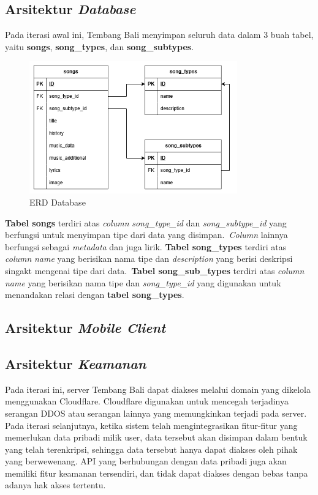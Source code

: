 \documentclass[a4paper, 12pt]{article}
\begin{document}
\subsection{Arsitektur \textit{Database}}
Pada iterasi awal ini, Tembang Bali menyimpan seluruh data dalam 3 buah tabel, yaitu \textbf{songs}, \textbf{song\_types}, dan \textbf{song\_subtypes}.

\begin{figure}[h]
    \centering
    \includegraphics[width=0.8\textwidth]{assets/erd.png}
    \caption{ERD Database}
\end{figure}

\textbf{Tabel songs} terdiri atas \textit{column} \textit{song\_type\_id} dan \textit{song\_subtype\_id} yang berfungsi untuk menyimpan tipe dari data yang disimpan.\
\textit{Column} lainnya berfungsi sebagai \textit{metadata} dan juga lirik.
\textbf{Tabel song\_types} terdiri atas \textit{column} \textit{name} yang berisikan nama tipe dan \textit{description} yang berisi deskripsi singakt mengenai tipe dari data.\
\textbf{Tabel song\_sub\_types} terdiri atas \textit{column} \textit{name} yang berisikan nama tipe dan \textit{song\_type\_id} yang digunakan untuk menandakan relasi dengan \textbf{tabel song\_types}.\

\subsection{Arsitektur \textit{Mobile Client}}

\subsection{Arsitektur \textit{Keamanan}}
Pada iterasi ini, server Tembang Bali dapat diakses melalui domain yang dikelola menggunakan Cloudflare. Cloudflare digunakan untuk mencegah terjadinya serangan DDOS atau serangan lainnya yang memungkinkan terjadi pada server.
Pada iterasi selanjutnya, ketika sistem telah mengintegrasikan fitur-fitur yang memerlukan data pribadi milik user, data tersebut akan disimpan dalam bentuk yang telah terenkripsi, sehingga data tersebut hanya dapat diakses oleh pihak yang berwewenang.
API yang berhubungan dengan data pribadi juga akan memiliki fitur keamanan tersendiri, dan tidak dapat diakses dengan bebas tanpa adanya hak akses tertentu.
\end{document}
